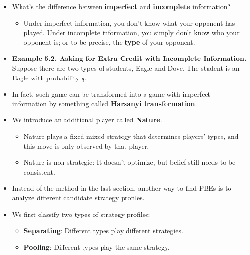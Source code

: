 \documentclass[notitlepage]{article}
\begin{document}
\begin{itemize}
    \item What's the difference between \textbf{imperfect} and \textbf{incomplete} information?
    \begin{itemize}
        \item Under imperfect information, you don't know what your opponent has played. Under incomplete information, you simply don't know who your opponent is; or to be precise, the \textbf{type} of your opponent.
    \end{itemize}
    \item \textbf{Example 5.2. Asking for Extra Credit with Incomplete Information.} Suppose there are two types of students, Eagle and Dove. The student is an Eagle with probability \(q\).
    \begin{figure}[h]
        \centering
        \resizebox{0.4\textwidth}{!}{
        
        }
    \end{figure}
    \item In fact, such game can be transformed into a game with imperfect information by something called \textbf{Harsanyi transformation}.
    \item We introduce an additional player called \textbf{Nature}.
    \begin{itemize}
        \item Nature plays a fixed mixed strategy that determines players' types, and this move is only observed by that player.
        \item Nature is non-strategic: It doesn't optimize, but belief still needs to be consistent.
    \end{itemize}
    \begin{figure}[h]
        \centering
        \resizebox{0.4\textwidth}{!}{
        
        }
    \end{figure}

    \item Instead of the method in the last section, another way to find PBEs is to analyze different candidate strategy profiles.
    \item We first classify two types of strategy profiles:
    \begin{itemize}
        \item \textbf{Separating}: Different types play different strategies.
        \item \textbf{Pooling}: Different types play the same strategy.
    \end{itemize}


\end{itemize}
\end{document}
